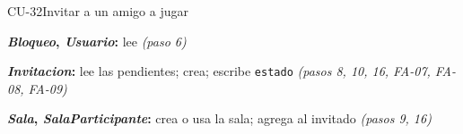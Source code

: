 \begin{fichacu}{CU-32}{Invitar a un amigo a jugar}
{\begin{cudatos}
      \item \textbf{\textit{Bloqueo}, \textit{Usuario}:} lee \textit{(paso 6)}
      \item \textbf{\textit{Invitacion}:} lee las pendientes; crea; escribe \texttt{estado} \textit{(pasos 8, 10, 16, \mbox{FA-07}, \mbox{FA-08}, \mbox{FA-09})}
      \item \textbf{\textit{Sala}, \textit{SalaParticipante}:} crea o usa la sala; agrega al invitado \textit{(pasos 9, 16)}
    \end{cudatos}} \\ \hline
\end{fichacu}
\clearpage
